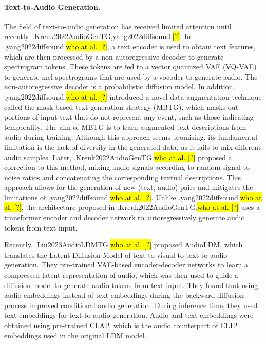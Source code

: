 \documentclass{article}
\let\realcite\cite
\renewcommand{\cite}[1]{\ifx.#1.\hl{[?]}\else\realcite{#1}\fi}
\let\realcitet\citet
\renewcommand{\citet}[1]{\ifx.#1.\hl{who at al. [?]}\else\realcitet{#1}\fi}
\begin{document}
\paragraph{Text-to-Audio Generation.}
The field of text-to-audio generation has received limited attention until recently~\cite{Kreuk2022AudioGenTG,yang2022diffsound}. In \citet{yang2022diffsound}, a text encoder is used to obtain text features, which are then processed by a non-autoregressive decoder to generate spectrogram tokens. These tokens are fed to a vector quantized VAE (VQ-VAE) to generate mel spectrograms that are used by a vocoder to generate audio. The non-autoregressive decoder is a probabilistic diffusion model. In addition, \citet{yang2022diffsound} introduced a novel data augmentation technique called the mask-based text generation strategy (MBTG), which masks out portions of input text that do not represent any event, such as those indicating temporality. The aim of MBTG is to learn augmented text descriptions from audio during training. Although this approach seems promising, its fundamental limitation is the lack of diversity in the generated data, as it fails to mix different audio samples. Later, \citet{Kreuk2022AudioGenTG} proposed a correction to this method, mixing audio signals according to random signal-to-noise ratios and concatenating the corresponding textual descriptions. This approach allows for the generation of new (text, audio) pairs and mitigates the limitations of \citet{yang2022diffsound}. Unlike \citet{yang2022diffsound}, the architecture proposed in \citet{Kreuk2022AudioGenTG} uses a transformer encoder and decoder network to autoregressively generate audio tokens from text input.

Recently, \citet{Liu2023AudioLDMTG} proposed AudioLDM, which translates the Latent Diffusion Model of text-to-visual to text-to-audio generation. They pre-trained VAE-based encoder-decoder networks to learn a compressed latent representation of audio, which was then used to guide a diffusion model to generate audio tokens from text input. They found that using audio embeddings instead of text embeddings during the backward diffusion process improved conditional audio generation. During inference time, they used text embeddings for text-to-audio generation. Audio and text embeddings were obtained using pre-trained CLAP, which is the audio counterpart of CLIP embeddings used in the original LDM model.
\end{document}
